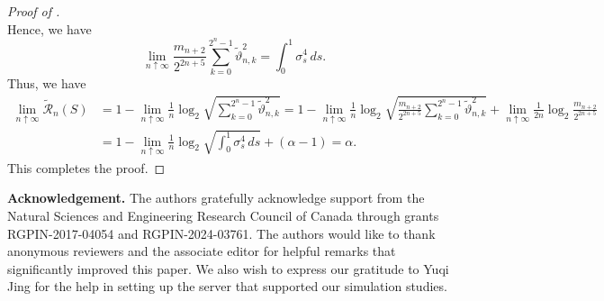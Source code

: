 \documentclass[12pt,reqno]{article}
\def\ua{\uparrow}
\def\wt{\widetilde}
\numberwithin{equation}{section}
\def\cR{{\mathscr R}}
\theoremstyle{definition}
\def\wt#1{\widetilde{#1}}
\def\ua{\uparrow}
\def\wt{\widetilde}
\begin{document}
\begin{proof}[Proof of ]
\begin{equation*}
	\end{equation*}
	Hence, we have 
	\begin{equation*}
		\lim_{n \ua \infty}\frac{m_{n+2}}{2^{2n+5}}\sum_{k = 0}^{2^n-1}\wt \vartheta^2_{n,k} = \int_0^1 \sigma^4_s \, ds. 
	\end{equation*}
	Thus, we have 
	\begin{equation*}
		\begin{split}
			\lim_{n \ua \infty} \wt \cR_n(S) &= 1 - \lim_{n \ua \infty} \frac{1}{n}\log_2 \sqrt{\sum_{k = 0}^{2^n-1}\wt \vartheta^2_{n,k}} = 1 - \lim_{n \ua \infty} \frac{1}{n}\log_2 \sqrt{\frac{m_{n+2}}{2^{2n+5}}\sum_{k = 0}^{2^n-1}\wt \vartheta^2_{n,k}} + \lim_{n \ua \infty}\frac{1}{2n}\log_2\frac{m_{n+2}}{2^{2n+5}}\\&= 1 - \lim_{n \ua \infty}\frac{1}{n}\log_2\sqrt{\int_0^1 \sigma_s^4\,ds} + (\alpha - 1) = \alpha. 
		\end{split}
	\end{equation*}
	This completes the proof.
\end{proof}


\noindent \textbf{Acknowledgement.} The authors gratefully acknowledge support from the Natural Sciences and Engineering Research Council of Canada through grants RGPIN-2017-04054  and RGPIN-2024-03761. The authors would like to thank anonymous reviewers and the associate editor for helpful remarks that significantly improved this paper. We also wish to express our gratitude to Yuqi Jing for the help in setting up the server that supported our simulation studies.


{}

%
\end{document}
